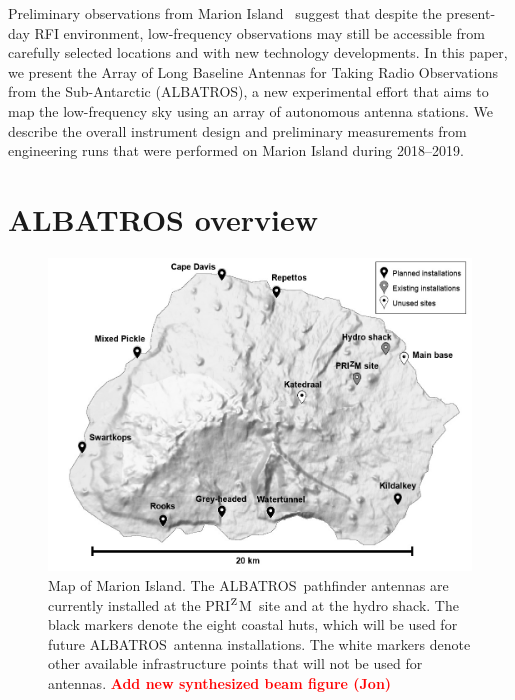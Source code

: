 \documentclass{ws-jai}
\def\albatros{ALBATROS}
\def\prizm{PRI$^{\rm Z}$M}
\newcommand{\attention}[1]{\textcolor{red}{\bf {#1}}}
\begin{document}
Preliminary observations from Marion
Island~\citep{2019JAI.....850004P} suggest that despite the
present-day RFI environment, low-frequency observations may still be
accessible from carefully selected locations and with new technology
developments.  In this paper, we present the Array of Long Baseline
Antennas for Taking Radio Observations from the Sub-Antarctic
(\albatros), a new experimental effort that aims to map the
low-frequency sky using an array of autonomous antenna stations.  We
describe the overall instrument design and preliminary measurements
from engineering runs that were performed on Marion Island during
2018--2019.

\section{ALBATROS overview}

\begin{figure}
  \begin{center}
    \includegraphics[width=0.7\linewidth]{Figures/marion_map/marion_map_annotated.jpg}
    \caption{Map of Marion Island.  The \albatros\ pathfinder antennas
      are currently installed at the \prizm\ site and at the hydro
      shack.  The black markers denote the eight coastal huts, which
      will be used for future \albatros\ antenna installations.  The
      white markers denote other available infrastructure points that
      will not be used for antennas.  \attention{Add new
        synthesized beam figure (Jon)}}
    \label{Fig:marion}
  \end{center}
\end{figure}

\end{document}
